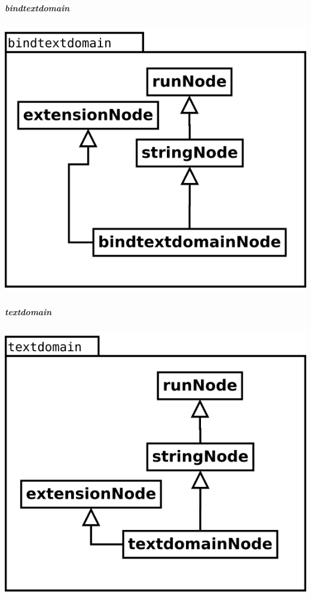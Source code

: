 \begin{multicols}{2}
\begin{center}
\end{center}
\columnbreak
\subparagraph {bindtextdomain}
\begin{center}
\includegraphics[scale=0.4]{bindtextdomain.png} \\
\end{center}
\subparagraph {textdomain}
\begin{center}
\includegraphics[scale=0.4]{textdomain.png} \\
\end{center}
\end{multicols}

